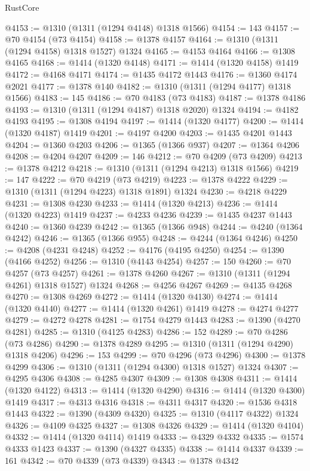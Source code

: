 \begin{lexlean}{RustCore}
\begin{coremodule}
@4153 := @1310 (@1311 (@1294 @4148) @1318 @1566)
@4154 := 143
@4157 := @70 @4154 (@73 @4154)
@4158 := @1378 @4157
@4164 := @1310 (@1311 (@1294 @4158) @1318 @1527) @1324
@4165 := @4153 @4164
@4166 := @1308 @4165
@4168 := @1414 (@1320 @4148)
@4171 := @1414 (@1320 @4158) @1419
@4172 := @4168 @4171
@4174 := @1435 @4172 @1443
@4176 := @1360 @4174 @2021
@4177 := @1378 @140
@4182 := @1310 (@1311 (@1294 @4177) @1318 @1566)
@4183 := 145
@4186 := @70 @4183 (@73 @4183)
@4187 := @1378 @4186
@4193 := @1310 (@1311 (@1294 @4187) @1318 @2020) @1324
@4194 := @4182 @4193
@4195 := @1308 @4194
@4197 := @1414 (@1320 @4177)
@4200 := @1414 (@1320 @4187) @1419
@4201 := @4197 @4200
@4203 := @1435 @4201 @1443
@4204 := @1360 @4203
@4206 := @1365 (@1366 @937)
@4207 := @1364 @4206
@4208 := @4204 @4207
@4209 := 146
@4212 := @70 @4209 (@73 @4209)
@4213 := @1378 @4212
@4218 := @1310 (@1311 (@1294 @4213) @1318 @1566)
@4219 := 147
@4222 := @70 @4219 (@73 @4219)
@4223 := @1378 @4222
@4229 := @1310 (@1311 (@1294 @4223) @1318 @1891) @1324
@4230 := @4218 @4229
@4231 := @1308 @4230
@4233 := @1414 (@1320 @4213)
@4236 := @1414 (@1320 @4223) @1419
@4237 := @4233 @4236
@4239 := @1435 @4237 @1443
@4240 := @1360 @4239
@4242 := @1365 (@1366 @948)
@4244 := @4240 (@1364 @4242)
@4246 := @1365 (@1366 @955)
@4248 := @4244 (@1364 @4246)
@4250 := @4208 (@4231 @4248)
@4252 := @4176 (@4195 @4250)
@4254 := @1390 (@4166 @4252)
@4256 := @1310 (@4143 @4254)
@4257 := 150
@4260 := @70 @4257 (@73 @4257)
@4261 := @1378 @4260
@4267 := @1310 (@1311 (@1294 @4261) @1318 @1527) @1324
@4268 := @4256 @4267
@4269 := @4135 @4268
@4270 := @1308 @4269
@4272 := @1414 (@1320 @4130)
@4274 := @1414 (@1320 @4140)
@4277 := @1414 (@1320 @4261) @1419
@4278 := @4274 @4277
@4279 := @4272 @4278
@4281 := @1754 @4279 @1443
@4283 := @1390 (@4270 @4281)
@4285 := @1310 (@4125 @4283)
@4286 := 152
@4289 := @70 @4286 (@73 @4286)
@4290 := @1378 @4289
@4295 := @1310 (@1311 (@1294 @4290) @1318 @4206)
@4296 := 153
@4299 := @70 @4296 (@73 @4296)
@4300 := @1378 @4299
@4306 := @1310 (@1311 (@1294 @4300) @1318 @1527) @1324
@4307 := @4295 @4306
@4308 := @4285 @4307
@4309 := @1308 @4308
@4311 := @1414 (@1320 @4122)
@4313 := @1414 (@1320 @4290)
@4316 := @1414 (@1320 @4300) @1419
@4317 := @4313 @4316
@4318 := @4311 @4317
@4320 := @1536 @4318 @1443
@4322 := @1390 (@4309 @4320)
@4325 := @1310 (@4117 @4322) @1324
@4326 := @4109 @4325
@4327 := @1308 @4326
@4329 := @1414 (@1320 @4104)
@4332 := @1414 (@1320 @4114) @1419
@4333 := @4329 @4332
@4335 := @1574 @4333 @1423
@4337 := @1390 (@4327 @4335)
@4338 := @1414 @4337
@4339 := 161
@4342 := @70 @4339 (@73 @4339)
@4343 := @1378 @4342

\end{coremodule}
\end{lexlean}
